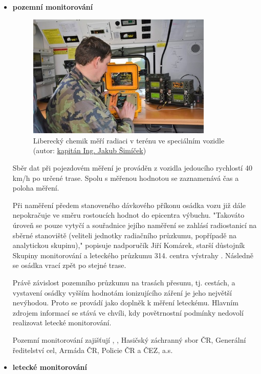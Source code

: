 \begin{itemize}
		
	\item \textbf{pozemní monitorování}
	
\begin{figure}[H]
    \centering
      \includegraphics[width=250pt]{./pictures/02_mereni-radiace-v-terenu-z-vozidla_2.jpg}
      \caption[Liberecký chemik měří radiaci v terénu ve speciálním vozidle]{Liberecký chemik měří radiaci v terénu ve speciálním vozidle
      (autor: \href{http://www.acr.army.cz/informacni-servis/zpravodajstvi/armadni-radiacni-monitorovaci-site-nacvicoval-zasah-pri-radiaci-131355/}{kapitán Ing. Jakub Šimíček})}
      \label{fig:pozemni}
\end{figure}
	
	Sběr dat při pojezdovém měření je prováděn z vozidla jedoucího rychlostí 40 km/h po určené trase. Spolu s měřenou hodnotou se zaznamenává čas a poloha měření.
	
	Při naměření předem stanoveného dávkového příkonu osádka vozu již dále nepokračuje ve směru rostoucích hodnot do epicentra výbuchu. "Takováto úroveň se pouze vytyčí a souřadnice jejího naměření se zahlásí radiostanicí na sběrné stanoviště (veliteli jednotky radiačního průzkumu, popřípadě na analytickou skupinu)," popisuje nadporučík Jiří Komárek, starší důstojník Skupiny monitorování a leteckého průzkumu 314. centra výstrahy . Následně se osádka vrací zpět po stejné trase. 
	
	Právě závislost pozemního průzkumu na trasách přesunu, tj. cestách, a vystavení osádky vyšším hodnotám ionizujícího záření je jeho největší nevýhodou. Proto se provádí jako doplněk k měření leteckému. Hlavním zdrojem informací se stává ve chvíli, kdy povětrnostní podmínky nedovolí realizovat letecké monitorování.
	
	Pozemní monitorování zajišťují , , Hasičský záchranný sbor ČR, Generální ředitelství cel, Armáda ČR, Policie ČR a ČEZ, a.s. 
	
	\item \textbf{letecké monitorování}
	

\end{itemize}
